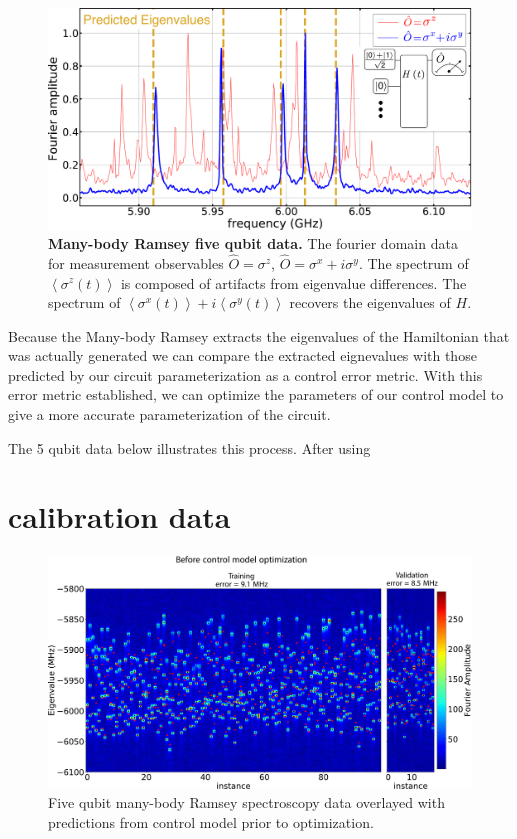 \begin{figure}[h]
    \begin{center}
        \includegraphics[width=150 mm]{./PDF/mbr_peaks_5q_data_191016_1057a.pdf}
    \end{center}
    \caption{\textbf{Many-body Ramsey five qubit data.}
    The fourier domain data for measurement observables
    $\hat{O}=\sigma^z$, $\hat{O}=\sigma^x + i \sigma^y$.
    The spectrum of $\left< \sigma^z (t) \right>$ is composed of artifacts from eigenvalue differences.
    The spectrum of $\left< \sigma^x (t) \right> + i \left< \sigma^y (t) \right>$ recovers the eigenvalues of $H$.
    }
    \label{mbr_peaks_data}
\end{figure}

Because the Many-body Ramsey extracts the eigenvalues of the Hamiltonian that was actually
generated we can compare the extracted eignevalues with those predicted by our circuit parameterization as a control error metric.
With this error metric established, we can optimize the parameters of our control model to give a more accurate parameterization of the circuit.

The 5 qubit data below illustrates this process.
After using
\section{calibration data}
\begin{figure}[h]
    \begin{center}
        \includegraphics[width=150 mm]{./PDF/fourier_amp_2d_tv_pre.pdf}
        \caption{
        Five qubit many-body Ramsey spectroscopy data overlayed with predictions from control model prior to optimization.
        }
    \end{center}
\end{figure}

